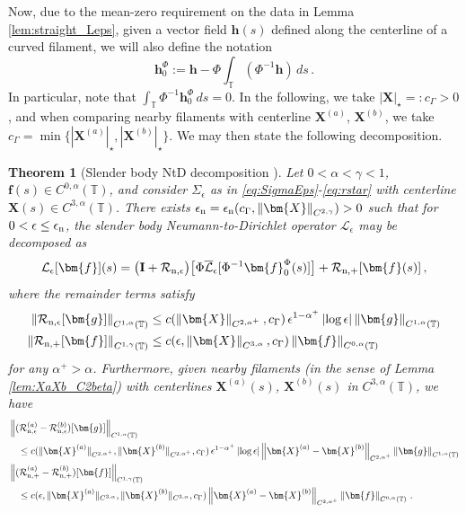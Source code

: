 \documentclass[11pt,reqno]{amsart}
\newcommand{\T}{\mathbb{T}}
\newcommand{\X}{\bm{X}}
\newcommand{\abs}[1]{\left\lvert #1 \right\rvert}
\newcommand{\norm}[1]{\left\lVert #1 \right\rVert}
\newcommand{\mc}[1]{\mathcal{#1}}
\newtheorem{theorem}{Theorem}[section]
\theoremstyle{definition}
\begin{document}
Now, due to the mean-zero requirement on the data in Lemma \ref{lem:straight_Leps}, given a vector field $\bm{h}(s)$ defined along the centerline of a curved filament, we will also define the notation 
\begin{equation}\label{eq:subtract_mean}
\bm{h}_0^\Phi := \bm{h}-\Phi\int_\T(\Phi^{-1}\bm{h})\,ds\,.
\end{equation}
In particular, note that $\int_\T\Phi^{-1}\bm{h}_0^\Phi\,ds=0$. 
In the following, we take $\abs{\X}_\star=:c_\Gamma>0$, and when comparing nearby filaments with centerline $\X^{(a)}$, $\X^{(b)}$, we take $c_\Gamma=\min\{\abs{\X^{(a)}}_\star,\abs{\X^{(b)}}_\star\}$. 
We may then state the following decomposition.
%
%
%
\begin{theorem}[Slender body NtD decomposition \cite{ohm2024free}]\label{thm:decomp}
Let $0<\alpha<\gamma<1$, $\bm{f}(s)\in C^{0,\alpha}(\T)$, and consider $\Sigma_\epsilon$ as in \eqref{eq:SigmaEps}-\eqref{eq:rstar} with centerline $\X(s)\in C^{3,\alpha}(\T)$. There exists $\epsilon_{\rm n}=\epsilon_{\rm n}(c_\Gamma,\norm{\X}_{C^{2,\gamma}})>0$ such that for $0<\epsilon\le \epsilon_{\rm n}$, the slender body Neumann-to-Dirichlet operator $\mc{L}_\epsilon$ may be decomposed as 
\begin{equation}\label{eq:thm_NtD_decomp}
\mc{L}_\epsilon[\bm{f}](s) = \big({\bf I} + \mc{R}_{\rm n,\epsilon}\big)\big[\Phi\overline{\mc{L}}_\epsilon[\Phi^{-1}\bm{f}_0^\Phi(s)]\big] +\mc{R}_{\rm n,+}[\bm{f}(s)]\,,
\end{equation}
where the remainder terms satisfy
\begin{equation}\label{eq:thm_NtD_ests}
\begin{aligned}
\norm{\mc{R}_{\rm n,\epsilon}[\bm{g}]}_{C^{1,\alpha}(\T)}&\le c(\norm{\X}_{C^{2,\alpha^+}},c_\Gamma)\,\epsilon^{1-\alpha^+}\abs{\log\epsilon}\norm{\bm{g}}_{C^{1,\alpha}(\T)}\\
\norm{\mc{R}_{\rm n,+}[\bm{f}]}_{C^{1,\gamma}(\T)} &\le c(\epsilon,\norm{\X}_{C^{3,\alpha}},c_\Gamma)\norm{\bm{f}}_{C^{0,\alpha}(\T)}
\end{aligned}
\end{equation}
for any $\alpha^+>\alpha$.
%
Furthermore, given nearby filaments (in the sense of Lemma \ref{lem:XaXb_C2beta}) with centerlines $\X^{(a)}(s)$, $\X^{(b)}(s)$ in $C^{3,\alpha}(\T)$, we have
\begin{equation}\label{eq:thm_NtD_ests_lip}
\begin{aligned}
&\norm{(\mc{R}_{\rm n,\epsilon}^{(a)}-\mc{R}_{\rm n,\epsilon}^{(b)})[\bm{g}]}_{C^{1,\alpha}(\T)}\\
&\quad \le c(\|\X^{(a)}\|_{C^{2,\alpha^+}},\|\X^{(b)}\|_{C^{2,\alpha^+}},c_\Gamma)\, \epsilon^{1-\alpha^+}\abs{\log\epsilon}\norm{\X^{(a)}-\X^{(b)}}_{C^{2,\alpha^+}}\norm{\bm{g}}_{C^{1,\alpha}(\T)} \\
%
&\norm{(\mc{R}_{\rm n,+}^{(a)}-\mc{R}_{\rm n,+}^{(b)})[\bm{f}]}_{C^{1,\gamma}(\T)}\\
&\quad \le c(\epsilon,\|\X^{(a)}\|_{C^{3,\alpha}},\|\X^{(b)}\|_{C^{3,\alpha}},c_\Gamma)\norm{\X^{(a)}-\X^{(b)}}_{C^{2,\alpha^+}}\norm{\bm{f}}_{C^{0,\alpha}(\T)}\,.
\end{aligned}
\end{equation}
%
\end{theorem}
\end{document}

